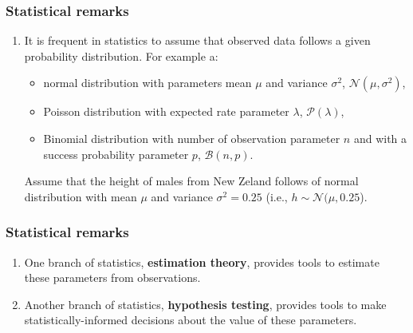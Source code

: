 \documentclass{beamer}
\newcounter{saveenumi}
\newcommand{\seti}{\setcounter{saveenumi}{\value{enumi}}}
\newcommand{\conti}{\setcounter{enumi}{\value{saveenumi}}}
\begin{document}
\begin{frame}
\frametitle{Statistical remarks}

    \begin{enumerate}

        \item It is frequent in statistics to assume that observed data follows
            a given probability distribution. For example a:

            \begin{itemize}

                \item normal distribution with parameters mean $\mu$ and variance
                    $\sigma^2$, $\mathcal{N}(\mu,\sigma^2)$,

                \item Poisson distribution with expected rate parameter $\lambda$,
                    $\mathcal{P}(\lambda)$,

                \item Binomial distribution with number of observation parameter $n$
                    and with a success probability parameter $p$,
                    $\mathcal{B}(n,p)$.

            \end{itemize}

             {
            \begin{example}

                Assume that the height of males from New Zeland follows of
                normal distribution with mean $\mu$ and variance
                $\sigma^2=0.25$ (i.e., $h\sim\mathcal{N}(\mu,0.25$).

            \end{example}
            }
            \seti
    \end{enumerate}

\end{frame}

\begin{frame}
\frametitle{Statistical remarks}

    \begin{enumerate}

        \conti

        \item One branch of statistics, \textbf{estimation theory}, provides
            tools to estimate these parameters from observations.

        \item Another branch of statistics, \textbf{hypothesis testing},
            provides tools to make statistically-informed decisions about the
            value of these parameters.

            \seti

    \end{enumerate}

\end{frame}
\end{document}
